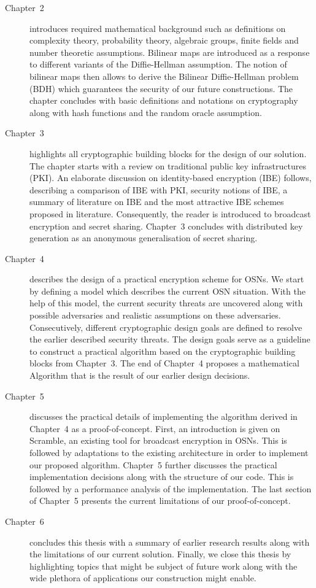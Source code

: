 \begin{description}
 \item[Chapter~2] introduces required mathematical background such as definitions on complexity theory, probability theory, algebraic groups, finite fields and number theoretic assumptions. Bilinear maps are introduced as a response to different variants of the Diffie-Hellman assumption. The notion of bilinear maps then allows to derive the Bilinear Diffie-Hellman problem (BDH) which guarantees the security of our future constructions. The chapter concludes with basic definitions and notations on cryptography along with hash functions and the random oracle assumption.

 \item[Chapter~3] highlights all cryptographic building blocks for the design of our solution. The chapter starts with a review on traditional public key infrastructures (PKI). An elaborate discussion on identity-based encryption (IBE) follows, describing a comparison of IBE with PKI, security notions of IBE, a summary of literature on IBE and the most attractive IBE schemes proposed in literature. Consequently, the reader is introduced to broadcast encryption and secret sharing. Chapter~3 concludes with distributed key generation as an anonymous generalisation of secret sharing.

 \item[Chapter~4] describes the design of a practical encryption scheme for OSNs. We start by defining a model which describes the current OSN situation. With the help of this model, the current security threats are uncovered along with possible adversaries and realistic assumptions on these adversaries. Consecutively, different cryptographic design goals are defined to resolve the earlier described security threats. The design goals serve as a guideline to construct a practical algorithm based on the cryptographic building blocks from Chapter~3. The end of Chapter~4 proposes a mathematical Algorithm that is the result of our earlier design decisions.

 \item[Chapter~5] discusses the practical details of implementing the algorithm derived in Chapter~4 as a proof-of-concept. First, an introduction is given on Scramble, an existing tool for broadcast encryption in OSNs. This is followed by adaptations to the existing architecture in order to implement our proposed algorithm. Chapter~5 further discusses the practical implementation decisions along with the structure of our code. This is followed by a performance analysis of the implementation. The last section of Chapter~5 presents the current limitations of our proof-of-concept.

 \item[Chapter~6] concludes this thesis with a summary of earlier research results along with the limitations of our current solution. Finally, we close this thesis by highlighting topics that might be subject of future work along with the wide plethora of applications our construction might enable.

\end{description}

